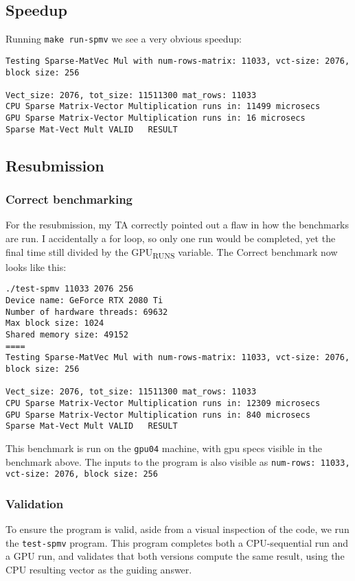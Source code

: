 \documentclass[11pt]{article}
\begin{document}
\subsection{Speedup}
\label{sec:orgbc3bd34}
Running \texttt{make run-spmv} we see a very obvious speedup:
\begin{verbatim}
Testing Sparse-MatVec Mul with num-rows-matrix: 11033, vct-size: 2076, block size: 256

Vect_size: 2076, tot_size: 11511300 mat_rows: 11033
CPU Sparse Matrix-Vector Multiplication runs in: 11499 microsecs
GPU Sparse Matrix-Vector Multiplication runs in: 16 microsecs
Sparse Mat-Vect Mult VALID   RESULT
\end{verbatim}

\subsection{Resubmission}
\label{sec:orgfb4a8b9}
\subsubsection{Correct benchmarking}
\label{sec:orgc9f12c7}
For the resubmission, my TA correctly pointed out a flaw in how the benchmarks are run.  
I accidentally a for loop, so only one run would be completed, yet the final time still
divided by the GPU\textsubscript{RUNS} variable. The Correct benchmark now looks like this:
\begin{verbatim}
./test-spmv 11033 2076 256
Device name: GeForce RTX 2080 Ti
Number of hardware threads: 69632
Max block size: 1024
Shared memory size: 49152
====
Testing Sparse-MatVec Mul with num-rows-matrix: 11033, vct-size: 2076, block size: 256

Vect_size: 2076, tot_size: 11511300 mat_rows: 11033
CPU Sparse Matrix-Vector Multiplication runs in: 12309 microsecs
GPU Sparse Matrix-Vector Multiplication runs in: 840 microsecs
Sparse Mat-Vect Mult VALID   RESULT
\end{verbatim}
This benchmark is run on the \texttt{gpu04} machine, with gpu specs visible in the benchmark
above. The inputs to the program is also visible as 
\texttt{num-rows: 11033, vct-size: 2076, block size: 256}

\subsubsection{Validation}
\label{sec:orgb755683}
To ensure the program is valid, aside from a visual inspection of the code, 
we run the \texttt{test-spmv} program. This program completes both a CPU-sequential run and a 
GPU run, and validates that both versions compute the same result, using the CPU
resulting vector as the guiding answer.  
\end{document}
